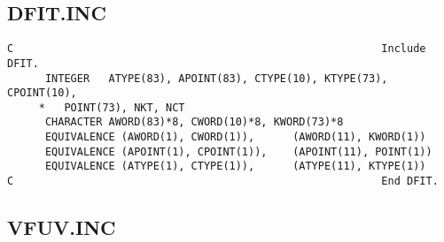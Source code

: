 \subsection{DFIT.INC}
\begin{verbatim}
C                                                          Include DFIT.
      INTEGER   ATYPE(83), APOINT(83), CTYPE(10), KTYPE(73), CPOINT(10),
     *   POINT(73), NKT, NCT
      CHARACTER AWORD(83)*8, CWORD(10)*8, KWORD(73)*8
      EQUIVALENCE (AWORD(1), CWORD(1)),      (AWORD(11), KWORD(1))
      EQUIVALENCE (APOINT(1), CPOINT(1)),    (APOINT(11), POINT(1))
      EQUIVALENCE (ATYPE(1), CTYPE(1)),      (ATYPE(11), KTYPE(1))
C                                                          End DFIT.

\end{verbatim}
\subsection{VFUV.INC}
